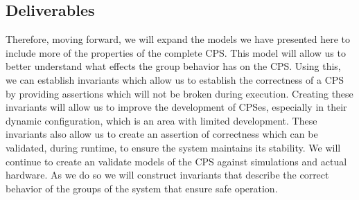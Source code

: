 \subsection{Deliverables}

Therefore, moving forward, we will expand the models we have presented here to include more of the properties of the complete CPS. This model will allow us to better understand what effects the group behavior has on the CPS. Using this, we can establish invariants which allow us to establish the correctness of a CPS by providing assertions which will not be broken during execution. Creating these invariants will allow us to improve the development of CPSes, especially in their dynamic configuration, which is an area with limited development. These invariants also allow us to create an assertion of correctness which can be validated, during runtime, to ensure the system maintains its stability. We will continue to create an validate models of the CPS against simulations and actual hardware. As we do so we will construct invariants that describe the correct behavior of the groups of the system that ensure safe operation. 
